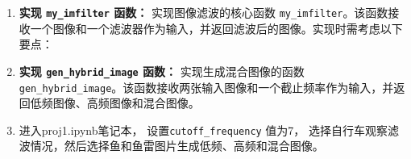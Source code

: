 \begin{enumerate}
    \item \textbf{实现 \texttt{my\_imfilter} 函数：}
    实现图像滤波的核心函数 \texttt{my\_imfilter}。该函数接收一个图像和一个滤波器作为输入，并返回滤波后的图像。实现时需考虑以下要点：

    \item \textbf{实现 \texttt{gen\_hybrid\_image} 函数：}
    实现生成混合图像的函数 \texttt{gen\_hybrid\_image}。该函数接收两张输入图像和一个截止频率作为输入，并返回低频图像、高频图像和混合图像。

    \item \textbf{}
    进入proj1.ipynb笔记本，
    设置\texttt{cutoff\_frequency} 值为7，
    选择自行车观察滤波情况，然后选择鱼和鱼雷图片生成低频、高频和混合图像。
\end{enumerate}
